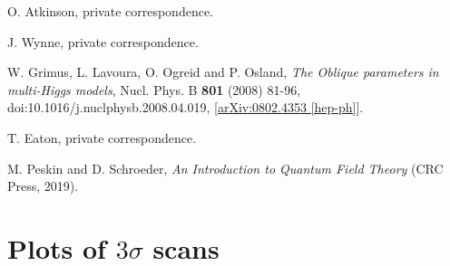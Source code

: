 \documentclass[a4paper,12pt]{article}
\begin{document}
\begin{thebibliography}{99}
O. Atkinson, private correspondence.

J. Wynne, private correspondence.

W. Grimus, L. Lavoura, O. Ogreid and P. Osland, \emph{The Oblique parameters in multi-Higgs models}, Nucl. Phys. B \textbf{801} (2008) 81-96, doi:10.1016/j.nuclphysb.2008.04.019, [\href{https://arxiv.org/abs/0802.4353}{arXiv:0802.4353 [hep-ph]}].

T. Eaton, private correspondence.

M. Peskin and D. Schroeder, \emph{An Introduction to Quantum Field Theory} (CRC Press, 2019).

\end{thebibliography}

\appendix
\section{Plots of $3\sigma$ scans}
\end{document}
